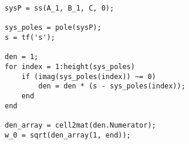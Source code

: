 \begin{lstlisting}[caption={Calculation of the Resonant Frequency}, label={lst:fs-resonant-freq}]
sysP = ss(A_1, B_1, C, 0);

sys_poles = pole(sysP);
s = tf('s');

den = 1;
for index = 1:height(sys_poles)
    if (imag(sys_poles(index)) ~= 0)
        den = den * (s - sys_poles(index));
    end
end

den_array = cell2mat(den.Numerator);
w_0 = sqrt(den_array(1, end));
\end{lstlisting}